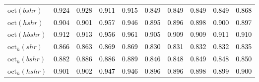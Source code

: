 \begin{tabular}[t]{l|ccccccccc}
oct$(bshr)$ & \textcolor{black}{0.924} & \textcolor{black}{0.928} & \textcolor{black}{0.911} & \textcolor{black}{0.915} & \textcolor{black}{0.849} & \textcolor{black}{0.849} & \textcolor{black}{0.849} & \textcolor{black}{0.849} & \textcolor{black}{0.868}\\
oct$(hshr)$ & \textcolor{black}{0.904} & \textcolor{black}{0.901} & \textcolor{black}{0.957} & \textcolor{black}{0.946} & \textcolor{black}{0.895} & \textcolor{black}{0.896} & \textcolor{black}{0.898} & \textcolor{black}{0.900} & \textcolor{black}{0.897}\\
oct$(hbshr)$ & \textcolor{black}{0.912} & \textcolor{black}{0.913} & \textcolor{black}{0.956} & \textcolor{black}{0.961} & \textcolor{black}{0.905} & \textcolor{black}{0.909} & \textcolor{black}{0.909} & \textcolor{black}{0.911} & \textcolor{black}{0.910}\\
oct$_h(shr)$ & \textcolor{black}{0.866} & \textcolor{black}{0.863} & \textcolor{black}{0.869} & \textcolor{black}{0.869} & \textcolor{black}{0.830} & \textcolor{black}{0.831} & \textcolor{black}{0.832} & \textcolor{black}{0.832} & \textcolor{black}{0.835}\\
oct$_h(bshr)$ & \textcolor{black}{0.882} & \textcolor{black}{0.886} & \textcolor{black}{0.886} & \textcolor{black}{0.889} & \textcolor{black}{0.846} & \textcolor{black}{0.848} & \textcolor{black}{0.849} & \textcolor{black}{0.848} & \textcolor{black}{0.850}\\
oct$_h(hshr)$ & \textcolor{black}{0.901} & \textcolor{black}{0.902} & \textcolor{black}{0.947} & \textcolor{black}{0.946} & \textcolor{black}{0.896} & \textcolor{black}{0.896} & \textcolor{black}{0.898} & \textcolor{black}{0.899} & \textcolor{black}{0.900}\\
\bottomrule
\end{tabular}
